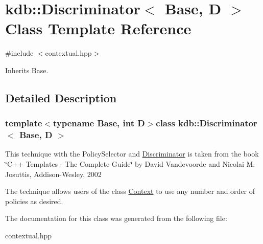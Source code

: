 \hypertarget{classkdb_1_1Discriminator}{\section{kdb\-:\-:Discriminator$<$ Base, D $>$ Class Template Reference}
\label{classkdb_1_1Discriminator}
}


{\ttfamily \#include $<$contextual.\-hpp$>$}



Inherits Base.



\subsection{Detailed Description}
\subsubsection*{template$<$typename Base, int D$>$class kdb\-::\-Discriminator$<$ Base, D $>$}

This technique with the Policy\-Selector and \hyperlink{classkdb_1_1Discriminator}{Discriminator} is taken from the book \char`\"{}\-C++ Templates -\/ The Complete Guide\char`\"{} by David Vandevoorde and Nicolai M. Josuttis, Addison-\/\-Wesley, 2002

The technique allows users of the class \hyperlink{classkdb_1_1Context}{Context} to use any number and order of policies as desired. 

The documentation for this class was generated from the following file\-:\begin{DoxyCompactItemize}
\item 
contextual.\-hpp\end{DoxyCompactItemize}

